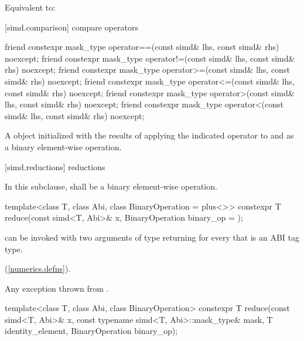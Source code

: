 \begin{itemdescr}
  \pnum\ConstraintOperatorTWellFormed

  \pnum\effects
  Equivalent to: 
\end{itemdescr}

[simd.comparison]{ compare operators}

\begin{itemdecl}
friend constexpr mask_type operator==(const simd& lhs, const simd& rhs) noexcept;
friend constexpr mask_type operator!=(const simd& lhs, const simd& rhs) noexcept;
friend constexpr mask_type operator>=(const simd& lhs, const simd& rhs) noexcept;
friend constexpr mask_type operator<=(const simd& lhs, const simd& rhs) noexcept;
friend constexpr mask_type operator>(const simd& lhs, const simd& rhs) noexcept;
friend constexpr mask_type operator<(const simd& lhs, const simd& rhs) noexcept;
\end{itemdecl}

\begin{itemdescr}
  \pnum\ConstraintOperatorTWellFormed

  \pnum\returns
  A  object initialized with the results of applying the indicated operator to  and  as a binary element-wise operation.
\end{itemdescr}

[simd.reductions]{\texorpdfstring{ r}{simd r}eductions}

\pnum
In this subclause,  shall be a binary element-wise operation.

\begin{itemdecl}
template<class T, class Abi, class BinaryOperation = plus<>>
  constexpr T reduce(const simd<T, Abi>& x, BinaryOperation binary_op = {});
\end{itemdecl}

\begin{itemdescr}
  \pnum\mandates
   can be invoked with two arguments of type  returning  for every  that is an ABI tag type.

  \pnum\returns
   \foralli (\ref{numerics.defns}).

  \pnum\throws
  Any exception thrown from .
\end{itemdescr}

\begin{itemdecl}
template<class T, class Abi, class BinaryOperation>
  constexpr T reduce(const simd<T, Abi>& x, const typename simd<T, Abi>::mask_type& mask,
                     T identity_element, BinaryOperation binary_op);
\end{itemdecl}

